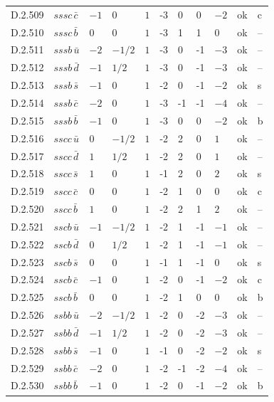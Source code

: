 {\begin{longtable}{@{}llllllllll>{\raggedright\arraybackslash}p{2.0cm}@{}}
D.2.509 & $sssc\,\bar{c}$ & $-1$ & $0$ & $1$ & -3 & 0 & 0 & $-2$ & ok & c \\
D.2.510 & $sssc\,\bar{b}$ & $0$ & $0$ & $1$ & -3 & 1 & 1 & $0$ & ok & -- \\
D.2.511 & $sssb\,\bar{u}$ & $-2$ & $-1/2$ & $1$ & -3 & 0 & -1 & $-3$ & ok & -- \\
D.2.512 & $sssb\,\bar{d}$ & $-1$ & $1/2$ & $1$ & -3 & 0 & -1 & $-3$ & ok & -- \\
D.2.513 & $sssb\,\bar{s}$ & $-1$ & $0$ & $1$ & -2 & 0 & -1 & $-2$ & ok & s \\
D.2.514 & $sssb\,\bar{c}$ & $-2$ & $0$ & $1$ & -3 & -1 & -1 & $-4$ & ok & -- \\
D.2.515 & $sssb\,\bar{b}$ & $-1$ & $0$ & $1$ & -3 & 0 & 0 & $-2$ & ok & b \\
D.2.516 & $sscc\,\bar{u}$ & $0$ & $-1/2$ & $1$ & -2 & 2 & 0 & $1$ & ok & -- \\
D.2.517 & $sscc\,\bar{d}$ & $1$ & $1/2$ & $1$ & -2 & 2 & 0 & $1$ & ok & -- \\
D.2.518 & $sscc\,\bar{s}$ & $1$ & $0$ & $1$ & -1 & 2 & 0 & $2$ & ok & s \\
D.2.519 & $sscc\,\bar{c}$ & $0$ & $0$ & $1$ & -2 & 1 & 0 & $0$ & ok & c \\
D.2.520 & $sscc\,\bar{b}$ & $1$ & $0$ & $1$ & -2 & 2 & 1 & $2$ & ok & -- \\
D.2.521 & $sscb\,\bar{u}$ & $-1$ & $-1/2$ & $1$ & -2 & 1 & -1 & $-1$ & ok & -- \\
D.2.522 & $sscb\,\bar{d}$ & $0$ & $1/2$ & $1$ & -2 & 1 & -1 & $-1$ & ok & -- \\
D.2.523 & $sscb\,\bar{s}$ & $0$ & $0$ & $1$ & -1 & 1 & -1 & $0$ & ok & s \\
D.2.524 & $sscb\,\bar{c}$ & $-1$ & $0$ & $1$ & -2 & 0 & -1 & $-2$ & ok & c \\
D.2.525 & $sscb\,\bar{b}$ & $0$ & $0$ & $1$ & -2 & 1 & 0 & $0$ & ok & b \\
D.2.526 & $ssbb\,\bar{u}$ & $-2$ & $-1/2$ & $1$ & -2 & 0 & -2 & $-3$ & ok & -- \\
D.2.527 & $ssbb\,\bar{d}$ & $-1$ & $1/2$ & $1$ & -2 & 0 & -2 & $-3$ & ok & -- \\
D.2.528 & $ssbb\,\bar{s}$ & $-1$ & $0$ & $1$ & -1 & 0 & -2 & $-2$ & ok & s \\
D.2.529 & $ssbb\,\bar{c}$ & $-2$ & $0$ & $1$ & -2 & -1 & -2 & $-4$ & ok & -- \\
D.2.530 & $ssbb\,\bar{b}$ & $-1$ & $0$ & $1$ & -2 & 0 & -1 & $-2$ & ok & b \\

\end{longtable}}
